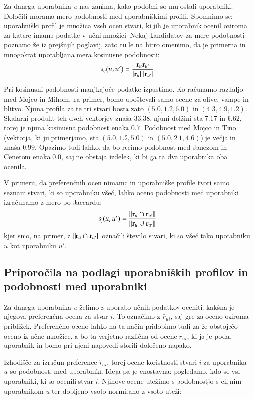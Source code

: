 Za danega uporabnika $u$ nas zanima, kako podobni so mu ostali uporabniki. Določiti moramo mero podobnosti med uporabniškimi profili. Spomnimo se: uporabniški profil je množica vseh ocen stvari, ki jih je uporabnik ocenil oziroma za katere imamo podatke v učni množici. Nekaj kandidatov za mere podobnosti poznamo že iz prejšnjih poglavij, zato tu le na hitro omenimo, da je primerna in mnogokrat uporabljana mera kosinusne podobnosti:
%
$$ s_{\rm c}(u,u')={{\bf r}_u {\bf r}_{u'} \over |{\bf r}_u|\ |{\bf r}_{u'}|}$$
%

Pri kosinusni podobnosti manjkajoče podatke izpustimo. Ko računamo razdaljo med Mojco in Mihom, na primer, bomo upoštevali samo ocene za olive, vampe in blitvo. Njuna profila za te tri stvari bosta zato $(5.0, 1.2, 5.0)$ in $(4.3, 4.9, 1.2)$. Skalarni produkt teh dveh vektorjev znaša $33.38$, njuni dolžini sta $7.17$ in $6.62$, torej je njuna kosinusna podobnost enaka $0.7$. Podobnost med Mojco in Tino (vektorja, ki ju primerjamo, sta $(5.0, 1.2, 5.0)$ in $(5.0, 2.1, 4.6)$) je večja in znaša $0.99$. Opazimo tudi lahko, da bo recimo podobnost med Janezom in Cenetom enaka $0.0$, saj ne obstaja izdelek, ki bi ga ta dva uporabnika oba ocenila.

V primeru, da preferenčnih ocen nimamo in uporabniške profile tvori samo seznam stvari, ki so uporabniku všeč, lahko oceno podobnosti med uporabniki izračunamo z mero po Jaccardu:
%
$$ s_{\rm J}(u, u')={||{\bf r}_u\cap{\bf r}_{u'}|| \over ||{\bf r}_u\cup{\bf r}_{u'}||}$$
kjer smo, na primer, z $||{\bf r}_u\cap{\bf r}_{u'}||$ označili število stvari, ki so všeč tako uporabniku $u$ kot uporabniku $u'$.

\subsection{Priporočila na podlagi uporabniških profilov in podobnosti med uporabniki}

Za danega uporabnika $u$ želimo z uporabo učnih podatkov oceniti, kakšna je njegova preferenčna ocena za stvar $i$. To označimo z $\hat{r}_{ui}$, saj gre za oceno oziroma približek. Preferenčno oceno lahko na ta način pridobimo tudi za že obstoječo oceno iz učne množice, a bo ta verjetno različna od ocene $r_{ui}$, ki jo je podal uporabnik in bomo pri njeni napovedi storili določeno napako.

Izhodišče za izračun preference $\hat{r}_{ui}$, torej ocene koristnosti stvari $i$ za uporabnika $u$ so podobnosti med uporabniki. Ideja pa je enostavna: pogledamo, kdo so vsi uporabniki, ki so ocenili stvar $i$. Njihove ocene utežimo s podobnostjo s ciljnim uporabnikom $u$ ter dobljeno vsoto normirano z vsoto uteži:

